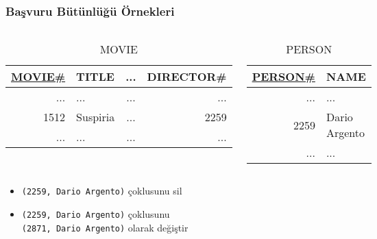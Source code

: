 \documentclass[dvipsnames]{beamer}
\theoremstyle{plain}
\begin{document}
\begin{frame}
  \frametitle{Başvuru Bütünlüğü Örnekleri}

   \begin{columns}[t]
    \begin{footnotesize}
    \begin{table}
      \caption{MOVIE}
      \begin{tabular}{|r|l|c|r|}\hline
\underline{MOVIE\#} & TITLE & ... & DIRECTOR\#\\[2pt]\hline\hline
                ... & ...      & ... &        ...\\\hline
               1512 & Suspiria & ... &       2259\\\hline
                ... & ...      & ... &        ...\\\hline
      \end{tabular}
    \end{table}
    \end{footnotesize}

    \begin{footnotesize}
    \begin{table}
      \caption{PERSON}
      \begin{tabular}{|r|l|}\hline
\underline{PERSON\#} & NAME\\[2pt]\hline\hline
        ... & ...          \\\hline
       2259 & Dario Argento\\\hline
        ... & ...          \\\hline
      \end{tabular}
    \end{table}
    \end{footnotesize}
  \end{columns}
  
    \begin{itemize}
      \item \texttt{(2259, Dario Argento)} çoklusunu sil
      \item \texttt{(2259, Dario Argento)} çoklusunu\\
        \texttt{(2871, Dario Argento)} olarak değiştir
    \end{itemize}
\end{frame}

\end{document}
